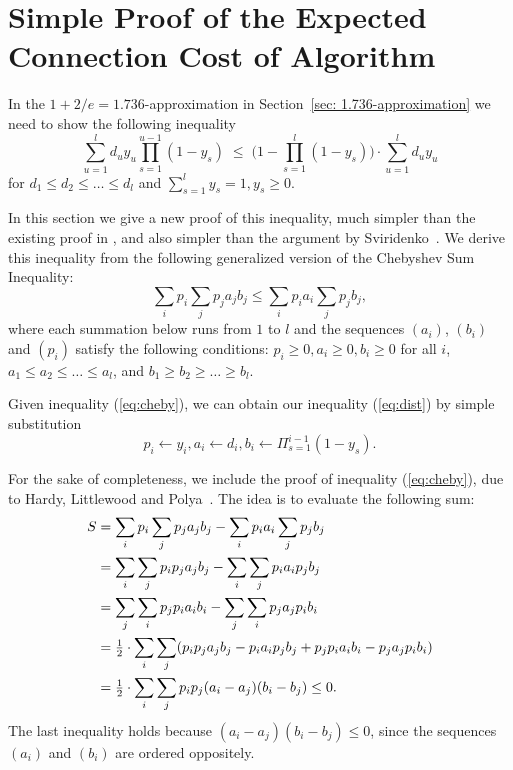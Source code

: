 \documentclass[11pt]{article}
\begin{document}

\section{Simple Proof of the Expected Connection Cost of Algorithm~{\ECHS}}

In the $1+2/e=1.736$-approximation in Section~\ref{sec: 1.736-approximation}
we need to show the following inequality
%
\begin{equation}
  \label{eq:dist}
\sum_{u=1}^l d_uy_u\prod_{s=1}^{u-1}(1-y_s)
  \;\leq\;  \Big(1 - \prod_{s=1}^l (1-y_s)\Big) \cdot \sum_{u=1}^l d_u y_u
\end{equation}
%
for $d_1\leq d_2 \leq \ldots \leq d_l$ and $\sum_{s=1}^l y_s = 1, y_s \geq 0$.

In this section we give a new proof of this inequality, much
simpler than the existing proof in \cite{ChudakS04}, and also simpler than
the argument by Sviridenko~\cite{Svi02}.  
We derive this inequality from the following generalized version of the Chebyshev Sum
Inequality:
%
\begin{equation}
  \label{eq:cheby}
  \sum_{i} p_i \sum_j p_j a_j b_j \leq \sum_i p_i a_i \sum_j p_j b_j,
\end{equation}
%
where each summation below runs from $1$ to $l$ and the sequences 
$(a_i)$, $(b_i)$ and $(p_i)$ satisfy the following conditions:
$p_i\geq 0, a_i \geq 0, b_i \geq 0$ for all $i$, $a_1\leq a_2 \leq
\ldots \leq a_l$, and $b_1 \geq b_2 \geq \ldots \geq b_l$.

Given inequality (\ref{eq:cheby}), we can obtain our inequality
(\ref{eq:dist}) by simple substitution
%
\begin{equation*}
  p_i \leftarrow y_i, a_i \leftarrow d_i, b_i \leftarrow
  \Pi_{s=1}^{i-1} (1-y_s).
\end{equation*}

For the sake of completeness, we include the proof of inequality (\ref{eq:cheby}), 
due to Hardy, Littlewood and Polya~\cite{HardyLP88}. The idea is to evaluate the 
following sum:
%
\begin{align*}
  S &= \sum_i p_i \sum_j p_j a_j b_j - \sum_i p_i a_i \sum_j p_j b_j
	\\
  & = \sum_i \sum_j p_i p_j a_j b_j - \sum_i \sum_j p_i a_i p_j b_j
	\\
  & = \sum_j \sum_i p_j p_i a_i b_i - \sum_j \sum _i p_j a_j p_i b_i
	\\
	&= {\mbox{$\frac{1}{2}$}} \cdot \sum_i \sum_j (p_i p_j a_j b_j - p_i a_i p_j b_j + p_j p_i a_i
  							b_i - p_j a_j p_i b_i)
\\
  &= {\mbox{$\frac{1}{2}$}} \cdot \sum_i \sum_j p_i p_j (a_i - a_j)(b_i - b_j) \leq 0.
\end{align*}
The last inequality holds because $(a_i-a_j)(b_i-b_j) \leq 0$, since the sequences
$(a_i)$ and $(b_i)$ are ordered oppositely.
\end{document}
